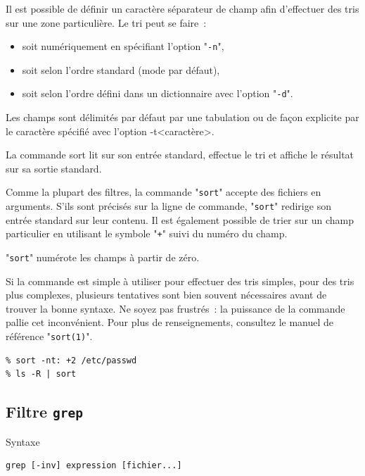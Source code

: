 Il est possible de d{\'e}finir un caract{\`e}re s{\'e}parateur de champ afin
d'effectuer des tris sur une zone particuli{\`e}re. Le tri peut se faire~:
\begin{itemize}
	\item soit num{\'e}riquement en sp{\'e}cifiant l'option "{\tt -n}",
	\item soit selon l'ordre {\ASCII} standard (mode par d{\'e}faut),
	\item soit selon l'ordre d{\'e}fini dans un dictionnaire avec l'option
		  "{\tt -d}".
\end{itemize}

Les champs sont d{\'e}limit{\'e}s par d{\'e}faut par une tabulation ou de fa\c{c}on
explicite par le caract{\`e}re sp{\'e}cifi{\'e} avec l'option -t<caract{\`e}re>.

La commande sort lit sur son entr{\'e}e standard, effectue le tri et affiche
le r{\'e}sultat sur sa sortie standard.

Comme la plupart des filtres, la commande "{\tt sort}" accepte des
fichiers en arguments. S'ils sont pr{\'e}cis{\'e}s sur la ligne de commande,
"{\tt sort}" redirige son entr{\'e}e standard sur leur contenu. Il est
{\'e}galement possible de trier sur un champ particulier en utilisant le
symbole "{\tt +}" suivi du num{\'e}ro du champ.

\begin{remarque}
"{\tt sort}" num{\'e}rote les champs {\`a} partir de z{\'e}ro.
\end{remarque}

Si la commande est simple {\`a} utiliser pour effectuer des tris simples,
pour des tris plus complexes, plusieurs tentatives sont bien souvent
n{\'e}cessaires avant de trouver la bonne syntaxe. Ne soyez pas frustr{\'e}s~: la
puissance de la commande pallie cet inconv{\'e}nient. Pour plus de
renseignements, consultez le manuel de r{\'e}f{\'e}rence "{\tt sort(1)}".

\begin{example}
\begin{verbatim}
% sort -nt: +2 /etc/passwd
% ls -R | sort
\end{verbatim}
\end{example}

\subsection{Filtre {\tt grep}}

\begin{definition}{Syntaxe}
\begin{verbatim}
grep [-inv] expression [fichier...]
\end{verbatim}
\end{definition}

